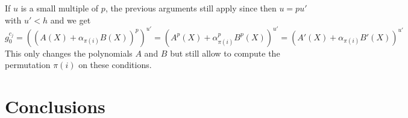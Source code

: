 \documentclass[12pt,a4paper,titlepage]{article}
\begin{document}
If $u$ is a small multiple of $p$, the previous arguments still apply since then $u = p u'$ with $u' < h$ and we get
$$ g_0^{c_j} = \left( \left( A(X) + \alpha_{\pi(i)} B(X) \right)^p \right)^{u'} = \left( A^p(X) + \alpha_{\pi(i)}^p B^p(X) \right)^{u'} = \left( A'(X) + \alpha_{\pi(i)} B'(X) \right)^{u'}$$
This only changes the polynomials $A$ and $B$ but still allow to compute the permutation $\pi(i)$ on these conditions.





\section{Conclusions}






\newpage
\appendix
\end{document}
